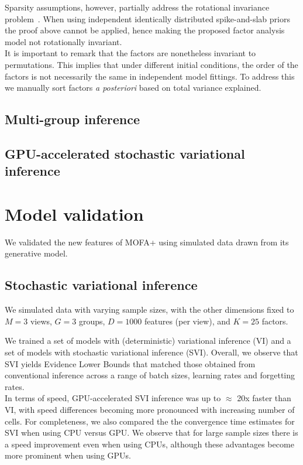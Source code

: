 Sparsity assumptions, however, partially address the rotational invariance problem~\cite{Hore2015-thesis}. When using independent identically distributed spike-and-slab priors the proof above cannot be applied, hence making the proposed factor analysis model not rotationally invariant.\\

It is important to remark that the factors are nonetheless invariant to permutations. This implies that under different initial conditions, the order of the factors is not necessarily the same in independent model fittings. To address this we manually sort factors \textit{a posteriori} based on total variance explained.



\subsection{Multi-group inference}

\subsection{GPU-accelerated stochastic variational inference}


\section{Model validation}

We validated the new features of MOFA+ using simulated data drawn from its generative model.

\subsection{Stochastic variational inference}

We simulated data with varying sample sizes, with the other dimensions fixed to $M=3$ views, $G=3$ groups, $D=1000$ features (per view), and $K=25$ factors.

We trained a set of models with (deterministic) variational inference (VI) and a set of models with stochastic variational inference (SVI). Overall, we observe that SVI yields Evidence Lower Bounds that matched those obtained from conventional inference across a range of batch sizes, learning rates and forgetting rates.\\
In terms of speed, GPU-accelerated SVI inference was up to $\approx$ 20x faster than VI, with speed differences becoming more pronounced with increasing number of cells. For completeness, we also compared the the convergence time estimates for SVI when using CPU versus GPU. We observe that for large sample sizes there is a speed improvement even when using CPUs, although these advantages become more prominent when using GPUs.

